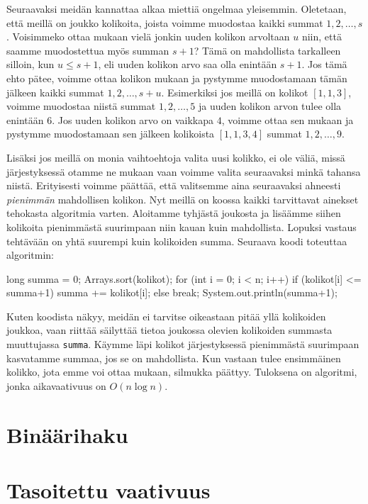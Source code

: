 Seuraavaksi meidän kannattaa alkaa miettiä ongelmaa yleisemmin.
Oletetaan, että meillä on joukko kolikoita,
joista voimme muodostaa kaikki summat $1,2,\dots,s$.
Voisimmeko ottaa mukaan vielä jonkin uuden kolikon arvoltaan $u$ niin,
että saamme muodostettua myös summan $s+1$?
Tämä on mahdollista tarkalleen silloin, kun $u \le s+1$,
eli uuden kolikon arvo saa olla enintään $s+1$.
Jos tämä ehto pätee, voimme ottaa kolikon mukaan ja
pystymme muodostamaan tämän jälkeen kaikki summat $1,2,\dots,s+u$.
Esimerkiksi jos meillä on kolikot $[1,1,3]$, voimme muodostaa
niistä summat $1,2,\dots,5$ ja uuden kolikon arvon tulee olla enintään $6$.
Jos uuden kolikon arvo on vaikkapa $4$, voimme ottaa sen mukaan ja
pystymme muodostamaan sen jälkeen kolikoista $[1,1,3,4]$ summat $1,2,\dots,9$.

Lisäksi jos meillä on monia vaihtoehtoja valita uusi kolikko,
ei ole väliä, missä järjestyksessä otamme ne mukaan vaan
voimme valita seuraavaksi minkä tahansa niistä.
Erityisesti voimme päättää, että valitsemme aina
seuraavaksi ahneesti \emph{pienimmän} mahdollisen kolikon.
Nyt meillä on koossa kaikki tarvittavat ainekset
tehokasta algoritmia varten.
Aloitamme tyhjästä joukosta ja lisäämme siihen kolikoita
pienimmästä suurimpaan niin kauan kuin mahdollista.
Lopuksi vastaus tehtävään on yhtä suurempi kuin kolikoiden
summa.
Seuraava koodi toteuttaa algoritmin:

\begin{code}
long summa = 0;
Arrays.sort(kolikot);
for (int i = 0; i < n; i++) {
    if (kolikot[i] <= summa+1) {
        summa += kolikot[i];
    } else {
        break;
    }
}
System.out.println(summa+1);
\end{code}

Kuten koodista näkyy, meidän ei tarvitse oikeastaan pitää yllä
kolikoiden joukkoa, vaan riittää säilyttää tietoa
joukossa olevien kolikoiden summasta muuttujassa \texttt{summa}.
Käymme läpi kolikot järjestyksessä pienimmästä suurimpaan
kasvatamme summaa, jos se on mahdollista.
Kun vastaan tulee ensimmäinen kolikko, jota emme voi ottaa mukaan,
silmukka päättyy.
Tuloksena on algoritmi, jonka aikavaativuus on $O(n \log n)$.

\section{Binäärihaku}



\section{Tasoitettu vaativuus}

